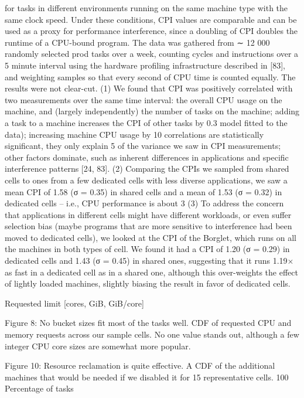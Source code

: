 for tasks in different environments running on the same machine type with the same clock speed. Under these conditions, CPI values are comparable and can be used as a proxy
for performance interference, since a doubling of CPI doubles the runtime of a CPU-bound program. The data was
gathered from ∼ 12 000 randomly selected prod tasks over
a week, counting cycles and instructions over a 5 minute interval using the hardware profiling infrastructure described
in [83], and weighting samples so that every second of CPU
time is counted equally. The results were not clear-cut.
(1) We found that CPI was positively correlated with
two measurements over the same time interval: the overall
CPU usage on the machine, and (largely independently) the
number of tasks on the machine; adding a task to a machine
increases the CPI of other tasks by 0.3%
model fitted to the data); increasing machine CPU usage by
10%
correlations are statistically significant, they only explain 5%
of the variance we saw in CPI measurements; other factors
dominate, such as inherent differences in applications and
specific interference patterns [24, 83].
(2) Comparing the CPIs we sampled from shared cells to
ones from a few dedicated cells with less diverse applications, we saw a mean CPI of 1.58 (σ = 0.35) in shared cells
and a mean of 1.53 (σ = 0.32) in dedicated cells – i.e., CPU
performance is about 3%
(3) To address the concern that applications in different
cells might have different workloads, or even suffer selection
bias (maybe programs that are more sensitive to interference
had been moved to dedicated cells), we looked at the CPI of
the Borglet, which runs on all the machines in both types of
cell. We found it had a CPI of 1.20 (σ = 0.29) in dedicated
cells and 1.43 (σ = 0.45) in shared ones, suggesting that
it runs 1.19× as fast in a dedicated cell as in a shared
one, although this over-weights the effect of lightly loaded
machines, slightly biasing the result in favor of dedicated
cells.

Requested limit [cores, GiB, GiB/core]

Figure 8: No bucket sizes fit most of the tasks well. CDF of
requested CPU and memory requests across our sample cells. No
one value stands out, although a few integer CPU core sizes are
somewhat more popular.

Figure 10: Resource reclamation is quite effective. A CDF of the
additional machines that would be needed if we disabled it for 15
representative cells.
100
Percentage of tasks

